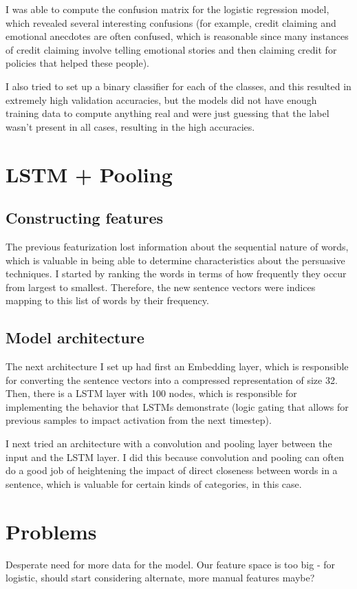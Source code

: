 \documentclass[letterpaper]{article}
\begin{document}
I was able to compute the confusion matrix for the logistic regression model, which revealed several interesting confusions (for example, credit claiming and emotional anecdotes are often confused, which is reasonable since many instances of credit claiming involve telling emotional stories and then claiming credit for policies that helped these people). 

I also tried to set up a binary classifier for each of the classes, and this resulted in extremely high validation accuracies, but the models did not have enough training data to compute anything real and were just guessing that the label wasn't present in all cases, resulting in the high accuracies.
\section*{LSTM + Pooling}
\subsection*{Constructing features}
The previous featurization lost information about the sequential nature of words, which is valuable in being able to determine characteristics about the persuasive techniques. I started by ranking the words in terms of how frequently they occur from largest to smallest. Therefore, the new sentence vectors were indices mapping to this list of words by their frequency.
\subsection*{Model architecture}
The next architecture I set up had first an Embedding layer, which is responsible for converting the sentence vectors into a compressed representation of size 32. Then, there is a LSTM layer with 100 nodes, which is responsible for implementing the behavior that LSTMs demonstrate (logic gating that allows for previous samples to impact activation from the next timestep).

I next tried an architecture with a convolution and pooling layer between the input and the LSTM layer. I did this because convolution and pooling can often do a good job of heightening the impact of direct closeness between words in a sentence, which is valuable for certain kinds of categories, in this case.
\section*{Problems}
Desperate need for more data for the model. Our feature space is too big - for logistic, should start considering alternate, more manual features maybe?
\end{document}

